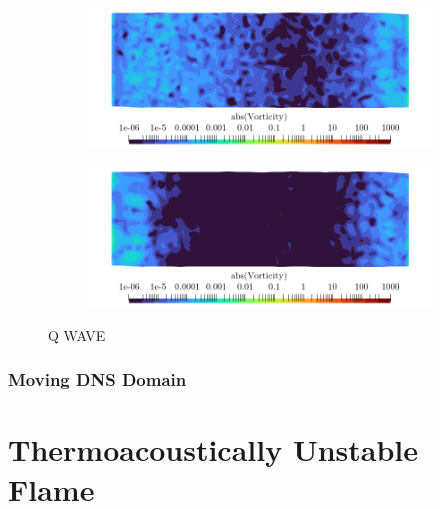 \begin{figure}[t]
    \begin{subfigure}{0.49\textwidth}
    \centering
    \includegraphics[scale=0.325]{assets/graphs/double-instab.0005.png}
    \caption{}
    \label{fig:qwave3}
    \end{subfigure}
    \begin{subfigure}{0.49\textwidth}
    \centering
    \includegraphics[scale=0.325]{assets/graphs/double-instab.0006.png}
    \caption{}
    \label{fig:qwave4}
    \end{subfigure}
\caption{Q WAVE}
\label{fig:qwave}
\end{figure}



\subsubsection{Moving DNS Domain}





\section{Thermoacoustically Unstable Flame}

